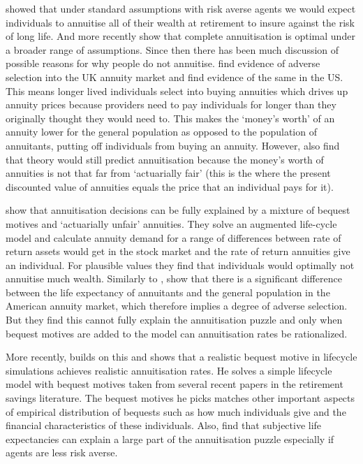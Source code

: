 \documentclass[12pt]{article}
\begin{document}
\cite{yaari_65} showed that under standard assumptions with risk averse agents
we would expect individuals to annuitise all of their wealth at retirement to
insure against the risk of long life. And more recently
\cite{davidoff_brown_diamond_aer_2005} show that complete annuitisation is
optimal under a broader range of assumptions. Since then there has been much
discussion of possible reasons for why people do not annuitise.
\cite{finkelstein_porteba_2002, finkelstein_porteba_2004} find evidence of
adverse selection into the UK annuity market and \cite{mitchell_et_al_1999} find
evidence of the same in the US. This means longer lived individuals select into
buying annuities which drives up annuity prices because providers need to pay
individuals for longer than they originally thought they would need to. This
makes the `money's worth' of an annuity lower for the general population as
opposed to the population of annuitants, putting off individuals from buying an
annuity. However, \cite{mitchell_et_al_1999} also find that theory would still
predict annuitisation because the money's worth of annuities is not that far
from `actuarially fair' (this is the where the present discounted value of annuities
equals the price that an individual pays for it).

\cite{friedman_warshawsky_qje_1990} show that annuitisation decisions can be
fully explained by a mixture of bequest motives and `actuarially unfair'
annuities. They solve an augmented life-cycle model and calculate annuity demand
for a range of differences between rate of return assets would get in the stock
market and the rate of return annuities give an individual. For plausible values
they find that individuals would optimally not annuitise much wealth. Similarly
to \cite{finkelstein_porteba_2004}, \cite{friedman_warshawsky_chicago_1988} show
that there is a significant difference between the life expectancy of annuitants
and the general population in the American annuity market, which therefore
implies a degree of adverse selection. But they find this cannot fully explain
the annuitisation puzzle and only when bequest motives are added to the model
can annuitisation rates be rationalized.

More recently, \cite{lockwood_red_2012} builds on this and shows that a
realistic bequest motive in lifecycle simulations achieves realistic
annuitisation rates. He solves a simple lifecycle model with bequest motives
taken from several recent papers in the retirement savings literature. The
bequest motives he picks matches other important aspects of empirical
distribution of bequests such as how much individuals give and the financial
characteristics of these individuals. Also, \cite{odea_sturrock_rest_2023} find
that subjective life expectancies can explain a large part of the annuitisation
puzzle especially if agents are less risk averse.
\end{document}
